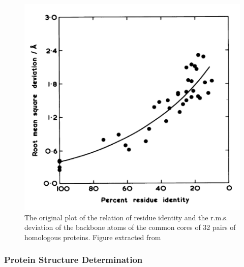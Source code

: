 \documentclass[12pt, a4paper,twoside]{tesi_upf}
\begin{document}
\begin{figure}[h]

  \centering
  	\includegraphics[scale=0.5]{../figures/structure_vs_sequence.png} %

	\caption{The original plot of the relation of residue identity and the r.m.s. deviation of the backbone atoms of the common cores of 32 pairs of homologous proteins. Figure extracted from \cite{StructureSequence}}
	\label{fig:strucrure_sequence_figure}
\end{figure}
 
\subsubsection{Protein Structure Determination}
\end{document}
